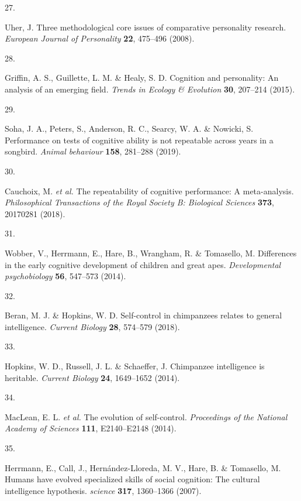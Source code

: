 \documentclass[
  man,floatsintext]{apa6}
\newlength{\cslhangindent}
\newlength{\csllabelwidth}
\newlength{\cslentryspacingunit} %
\newenvironment{CSLReferences}[2] %
 {%
  \setlength{\parindent}{0pt}
  \ifodd #1
  \let\oldpar\par
  \def\par{\hangindent=\cslhangindent\oldpar}
  \fi
  \setlength{\parskip}{#2\cslentryspacingunit}
 }%
 {}
\newcommand{\CSLLeftMargin}[1]{\parbox[t]{\csllabelwidth}{#1}}
\newcommand{\CSLRightInline}[1]{\parbox[t]{\linewidth - \csllabelwidth}{#1}\break}
\begin{document}
\begin{CSLReferences}{0}{0}
\leavevmode{}%
\CSLLeftMargin{27. }%
\CSLRightInline{Uher, J. Three methodological core issues of comparative personality research. \emph{European Journal of Personality} \textbf{22}, 475--496 (2008).}

\leavevmode{}%
\CSLLeftMargin{28. }%
\CSLRightInline{Griffin, A. S., Guillette, L. M. \& Healy, S. D. Cognition and personality: An analysis of an emerging field. \emph{Trends in Ecology \& Evolution} \textbf{30}, 207--214 (2015).}

\leavevmode{}%
\CSLLeftMargin{29. }%
\CSLRightInline{Soha, J. A., Peters, S., Anderson, R. C., Searcy, W. A. \& Nowicki, S. Performance on tests of cognitive ability is not repeatable across years in a songbird. \emph{Animal behaviour} \textbf{158}, 281--288 (2019).}

\leavevmode{}%
\CSLLeftMargin{30. }%
\CSLRightInline{Cauchoix, M. \emph{et al.} The repeatability of cognitive performance: A meta-analysis. \emph{Philosophical Transactions of the Royal Society B: Biological Sciences} \textbf{373}, 20170281 (2018).}

\leavevmode{}%
\CSLLeftMargin{31. }%
\CSLRightInline{Wobber, V., Herrmann, E., Hare, B., Wrangham, R. \& Tomasello, M. Differences in the early cognitive development of children and great apes. \emph{Developmental psychobiology} \textbf{56}, 547--573 (2014).}

\leavevmode{}%
\CSLLeftMargin{32. }%
\CSLRightInline{Beran, M. J. \& Hopkins, W. D. Self-control in chimpanzees relates to general intelligence. \emph{Current Biology} \textbf{28}, 574--579 (2018).}

\leavevmode{}%
\CSLLeftMargin{33. }%
\CSLRightInline{Hopkins, W. D., Russell, J. L. \& Schaeffer, J. Chimpanzee intelligence is heritable. \emph{Current Biology} \textbf{24}, 1649--1652 (2014).}

\leavevmode{}%
\CSLLeftMargin{34. }%
\CSLRightInline{MacLean, E. L. \emph{et al.} The evolution of self-control. \emph{Proceedings of the National Academy of Sciences} \textbf{111}, E2140--E2148 (2014).}

\leavevmode{}%
\CSLLeftMargin{35. }%
\CSLRightInline{Herrmann, E., Call, J., Hernández-Lloreda, M. V., Hare, B. \& Tomasello, M. Humans have evolved specialized skills of social cognition: The cultural intelligence hypothesis. \emph{science} \textbf{317}, 1360--1366 (2007).}


\end{CSLReferences}
\end{document}
